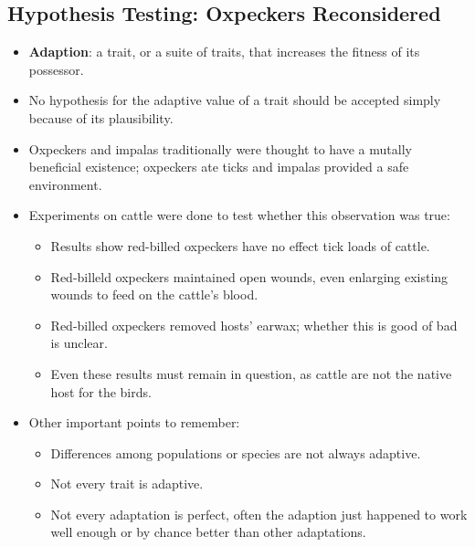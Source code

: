 \documentclass[12pt,a4paper]{article}
\begin{document}
\subsection{Hypothesis Testing: Oxpeckers Reconsidered}
\begin{itemize}
    \item \textbf{Adaption}: a trait, or a suite of traits, that increases the fitness of its possessor.
    \item No hypothesis for the adaptive value of a trait should be accepted simply because of its plausibility.
    \item Oxpeckers and impalas traditionally were thought to have a mutally beneficial existence; oxpeckers ate ticks and impalas provided a safe environment.
    \item Experiments on cattle were done to test whether this observation was true:
        \begin{itemize}
            \item Results show red-billed oxpeckers have no effect tick loads of cattle.
            \item Red-billeld oxpeckers maintained open wounds, even enlarging existing wounds to feed on the cattle's blood.
            \item Red-billed oxpeckers removed hosts' earwax; whether this is good of bad is unclear.
            \item Even these results must remain in question, as cattle are not the native host for the birds.
        \end{itemize}
    \item Other important points to remember: 
        \begin{itemize}
            \item Differences among populations or species are not always adaptive.
            \item Not every trait is adaptive.
            \item Not every adaptation is perfect, often the adaption just happened to work well enough or by chance better than other adaptations.
        \end{itemize} 
\end{itemize}
\end{document}
